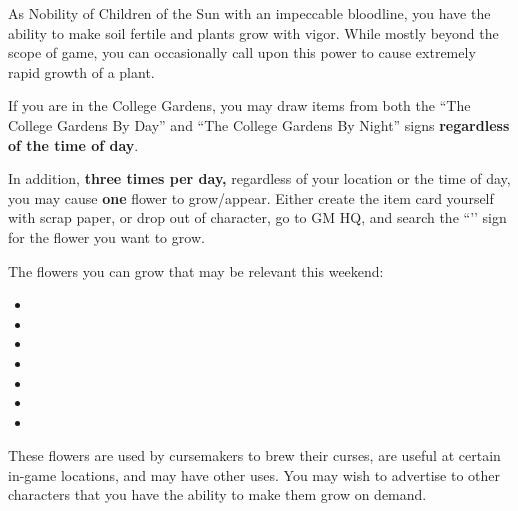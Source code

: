 \documentclass[green]{GL2020}
\begin{document}
\name{\gFlowerPower{}}

As Nobility of Children of the Sun with an impeccable bloodline, you have the ability to make soil fertile and plants grow with vigor. While mostly beyond the scope of game, you can occasionally call upon this power to cause extremely rapid growth of a plant. 

If you are in the College Gardens, you may draw items from both the ``The College Gardens By Day'' and ``The College Gardens By Night'' signs \textbf{regardless of the time of day}.

In addition, \textbf{three times per day,} regardless of your location or the time of day, you may cause \textbf{one} flower to grow/appear. Either create the item card yourself with scrap paper, or drop out of character, go to GM HQ, and search the ``\sFlowerPower{}’’ sign for the flower you want to grow.

The flowers you can grow that may be relevant this weekend:
\begin{itemize}
	\item \iBlackCrocus{}
	\item \iFlameOrchid{}
	\item \iHollyhock{}
	\item \iLily{}
	\item \iMoonflower{}
	\item \iNightshade{}
	\item \iMorningGlory{}
\end{itemize}

These flowers are used by cursemakers to brew their curses, are useful at certain in-game locations, and may have other uses. You may wish to advertise to other characters that you have the ability to make them grow on demand.
\end{document}

